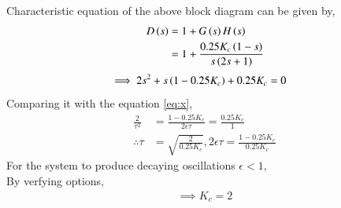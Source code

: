 \documentclass[journal,12pt,twocolumn]{IEEEtran}
\theoremstyle{remark}
\begin{document}
Characteristic equation of the above block diagram can be given by,
\begin{align}
     D\left(s\right) &= 1+G\left(s\right)H\left(s\right)   \\
     &= 1+\frac{0.25 K_c \left(1-s\right) }{s\left(2s+1\right)} 
\end{align}
\begin{align}
    \implies 2s^2+s\left(1-0.25K_c\right)+0.25K_c&=0  
\end{align}
Comparing it with the equation \eqref{eq:x},
\begin{align}
    \frac{2}{\tau^2}&=\frac{1-0.25K_c}{2\epsilon \tau}=\frac{0.25K_c}{1}    \\
    \therefore \tau&=\sqrt{\frac{2}{0.25K_c}} , 2\epsilon\tau=\frac{1-0.25K_c}{0.25K_c}
\end{align}
For the system to produce decaying oscillations {$\epsilon <1$},    \\
By verfying options,
\begin{align}
    \implies K_c=2
\end{align}
\end{document}
